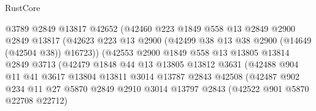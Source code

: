 \begin{lexlean}{RustCore}
\begin{coremodule}
                                  @3789
                                  @2849
                                  @13817
                                  @42652
                                  (@42460
                                    @223
                                    @1849
                                    @558
                                    @13
                                    @2849
                                    @2900
                                    @2849
                                    @13817
                                    (@42623
                                      @223
                                      @13
                                      @2900
                                      (@42499 @38 @13 @38 @2900 (@14649 (@42504 @38)) @16723))
                                    (@42553
                                      @2900
                                      @1849
                                      @558
                                      @13
                                      @13805
                                      @13814
                                      @2849
                                      @3713
                                      (@42479
                                        @1848
                                        @44
                                        @13
                                        @13805
                                        @13812
                                        @3631
                                        (@42488
                                          @904
                                          @11
                                          @41
                                          @3617
                                          @13804
                                          @13811
                                          @3014
                                          @13787
                                          @2843
                                          @42508
                                          (@42487
                                            @902
                                            @234
                                            @11
                                            @27
                                            @5870
                                            @2849
                                            @2910
                                            @3014
                                            @13797
                                            @2843
                                            (@42522 @901 @5870 @22708 @22712)

\end{coremodule}
\end{lexlean}
